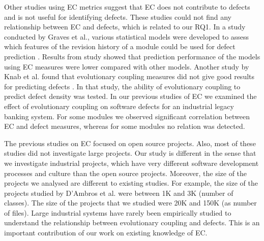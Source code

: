 \documentclass[times]{smrauth}
\begin{document}
Other studies using EC metrics suggest that EC does not contribute to defects and is not useful for identifying defects. These studies could not find any relationship between EC and defects, which is related to our RQ1. In a study conducted by Graves et al., various statistical models were developed to assess which features of the revision history of a module could be used for defect prediction \cite{graves2000predicting}. Results  from study showed that prediction performance of the models using EC measures were lower compared with other models. Another study by Knab et al. found that evolutionary coupling measures did not give good results for predicting defects \cite{knab2006predicting}. In that study, the ability of evolutionary coupling to predict defect density was tested. In our previous studies of EC \cite{Kirbas:2014:EEC:2652524.2652577} \cite{DBLP:conf/uyms/KirbasSCB14} we examined the effect of evolutionary coupling on software defects for an industrial legacy banking system. For some modules we observed significant correlation between EC and defect measures, whereas for some modules no relation was detected.

The previous studies on EC focused on open source projects. Also, most of these studies did not investigate large projects. Our study is different in the sense that we investigate industrial projects, which have very different software development processes and culture than the open source projects. Moreover, the size of the projects we analysed are different to existing studies. For example, the size of the projects studied by D'Ambros et al. \cite{d2009relationship} were between 1K and 3K (number of classes). The size of the projects that we studied were 20K and 150K (as number of files). Large industrial systems have rarely been empirically studied to understand the relationship between evolutionary coupling and defects. This is an important contribution of our work on existing knowledge of EC. 


\end{document}
